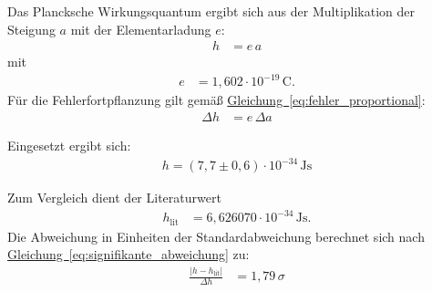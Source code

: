 Das Plancksche Wirkungsquantum ergibt sich aus der Multiplikation der Steigung $a$ mit der Elementarladung $e$:
\begin{align}
h &= e \, a \label{eq:h}
\end{align}
mit
\begin{align}
e &= 1{,}602 \cdot 10^{-19}\,\text{C}. \label{eq:e}
\end{align}
Für die Fehlerfortpflanzung gilt gemäß \hyperref[eq:fehler_proportional]{Gleichung~\ref*{eq:fehler_proportional}}:
\begin{align}
\Delta h &= e \, \Delta a \label{eq:dh}
\end{align}

Eingesetzt ergibt sich:
\begin{align}
    \boxed{
        h = (7{,}7 \pm 0,6) \cdot 10^{-34}\,\text{Js} \label{eq:h_result}
    }
\end{align}

Zum Vergleich dient der Literaturwert
\begin{align}
h_\text{lit} &= 6{,}626070 \cdot 10^{-34}\,\text{Js}. \label{eq:h_lit}
\end{align}
Die Abweichung in Einheiten der Standardabweichung berechnet sich nach \hyperref[eq:signifikante_abweichung]{Gleichung~\ref*{eq:signifikante_abweichung}} zu:
\begin{align}
\frac{|h - h_\text{lit}|}{\Delta h} &= 1{,}79\,\sigma \label{eq:abweichung}
\end{align}

